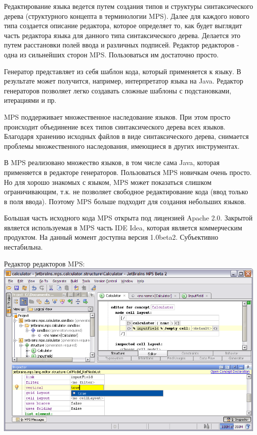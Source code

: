 \documentclass[a4paper,12pt]{article}
\begin{document}
Редактирование языка ведется путем создания типов и структуры синтаксического
дерева (структурного концепта в терминологии MPS). Далее для каждого нового типа
создается описание редактора, которое определяет то, как будет выглядит часть
редактора языка для данного типа синтаксического дерева. Делается это путем
расстановки полей ввода и различных подписей. Редактор редакторов - одна из
сильнейших сторон MPS. Пользоваться им достаточно просто.

Генератор представляет из себя шаблон кода, который применяется к языку. В
результате может получится, например, интерпретатор языка на Java. Редактор
генераторов позволяет легко создавать сложные шаблоны с подстановками,
итерациями и пр.

MPS поддерживает множественное наследование языков. При этом просто происходит 
объединение всех типов синтаксического дерева всех языков. Благодаря хранению
исходных файлов в виде синтаксического дерева, снимается проблемы
множественного наследования, имеющиеся в других инструментах.

В MPS реализовано множество языков, в том числе сама Java, которая применяется
в редакторе генераторов. Пользоваться MPS новичкам очень просто. Но для хорошо
знакомых с языком, MPS может показаться слишком ограничивающим, т.к. не позволяет
свободное редактирование кода (ввод только в поля ввода). Поэтому MPS больше
подходит для создания небольших языков.

Большая часть исходного кода MPS открыта под лицензией Apache 2.0. Закрытой
является используемая в MPS часть IDE Idea, которая является коммерческим
продуктом.
На данный момент доступна версия 1.0beta2. Субъективно нестабильна.

\begin{center}
Редактор редакторов MPS:
\includegraphics[scale=0.4]{img/mps.png}
\end{center}
\end{document}

